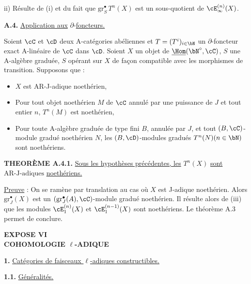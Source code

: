 ii) R\'esulte de (i) et du fait que $\mathrm{gr}_S^{\bullet}\,T^n(X)$ est un sous-quotient de $\cE_{\infty}^{(n)}(X)$.

\bigskip

\noindent
\textbf{A.4.} \underline{Application aux} $\partial$-\underline{foncteurs.}

Soient $\cC$ et $\cD$ deux A-cat\'egories ab\'eliennes et $T = (T^i)_{i \in \bN}$ un $\partial$-foncteur exact A-lin\'eaire de $\cC$ dans $\cD$. Soient $X$ un objet de $\underline{\Hom}(\bN^{\circ}, \cC)$, $S$ une A-alg\`ebre gradu\'ee, $S$ op\'erant sur $X$ de fa\c con compatible avec les morphismes de transition. Supposons que :
\begin{itemize}
\item[(i)] $X$ est AR-J-adique noeth\'erien,
\item[(ii)] Pour tout objet noeth\'erien $M$ de $\cC$ annul\'e par une puissance de $J$ et tout entier $n$, $T^n(M)$ est noeth\'erien,
\item[(iii)] Pour toute A-alg\`ebre gradu\'ee de type fini $B$, annul\'ee par $J$, et tout $(B,\cC)$-module gradu\'e noeth\'erien $N$, les $(B,\cD)$-modules gradu\'es $T^n(N) (n \in \bN)$ sont noeth\'eriens.
\end{itemize}

\hspace*{\parindent}
\textbf{THEOR\`EME A.4.1.} \underline{Sous les hypoth\`eses pr\'ec\'edentes, les} $T^n(X)$ \underline{sont} $\mathrm{AR\text{-}J\text{-}adiques}$ \underline{noeth\'eriens.}

\smallskip

\noindent
\underline{Preuve} : On se ram\`ene par translation au cas o\`u $X$ est J-adique noeth\'erien. Alors $\mathrm{gr}_J^{\bullet}(X)$ est un $(\mathrm{gr}_J^{\bullet}(A), \cC)$-module gradu\'e noeth\'erien. Il r\'esulte alors de (iii) que les modules $\cE_1^{(n)}(X)$ et $\cE_1^{(n-1)}(X)$ sont noeth\'eriens. Le th\'eor\`eme A.3 permet de conclure.

\newpage

\begin{center}
\Large\textbf{EXPOSE VI}\\[0.5em]
\textbf{COHOMOLOGIE $\ell$-ADIQUE}
\end{center}

\bigskip

\noindent
\textbf{1.} \underline{Cat\'egories de faisceaux $\ell$-adiques constructibles.}

\noindent
\textbf{1.1.} \underline{G\'en\'eralit\'es.}

